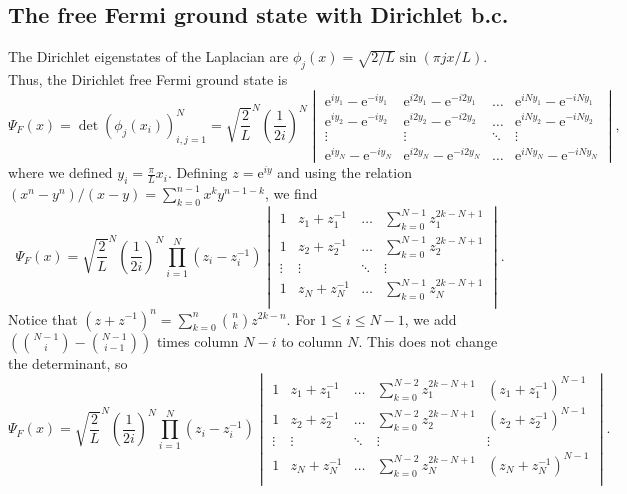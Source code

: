 \documentclass[a4paper,11pt]{article}
\newcommand{\euler}[1]{\text{e}^{#1}}
\numberwithin{equation}{section}
\begin{document}
	\subsection{The free Fermi ground state with Dirichlet b.c.}
	\label{secfreefermi}
	The Dirichlet eigenstates of the Laplacian are $ \phi_j(x)=\sqrt{2/L}\sin(\pi j x/L) $. Thus, the Dirichlet free Fermi ground state is \begin{equation}
		\Psi_F(x)=\det\left(\phi_j(x_i)\right)_{i,j=1}^{N}=\sqrt{\frac{2}{L}}^N\left(\frac{1}{2i}\right)^N\begin{vmatrix}
			\euler{iy_1}-\euler{-iy_1}&\euler{i2y_1}-\euler{-i2y_1}&\ldots&\euler{iNy_1}-\euler{-iNy_1}\\
			\euler{iy_2}-\euler{-iy_2}&\euler{i2y_2}-\euler{-i2y_2}&\ldots&\euler{iNy_2}-\euler{-iNy_2}\\
			\vdots&\vdots&\ddots&\vdots\\
			\euler{iy_N}-\euler{-iy_N}&\euler{i2y_N}-\euler{-i2y_N}&\ldots&\euler{iNy_N}-\euler{-iNy_N}
		\end{vmatrix},
	\end{equation}
	where we defined $ y_i=\frac{\pi}{L}x_i$. Defining $ z=\euler{iy} $ and using the relation $ (x^n-y^n)/(x-y)=\sum_{k=0}^{n-1}x^ky^{n-1-k} $, we find\begin{equation}
		\Psi_F(x)=\sqrt{\frac{2}{L}}^N\left(\frac{1}{2i}\right)^N\prod_{i=1}^{N}(z_i-z_i^{-1})\begin{vmatrix}
			1&z_1+z_1^{-1}&\ldots&\sum_{k=0}^{N-1}z_1^{2k-N+1}\\
			1&z_2+z_2^{-1}&\ldots&\sum_{k=0}^{N-1}z_2^{2k-N+1}\\
			\vdots&\vdots&\ddots&\vdots\\
			1&z_N+z_N^{-1}&\ldots&\sum_{k=0}^{N-1}z_N^{2k-N+1}\\
		\end{vmatrix}.
	\end{equation}
	Notice that $ (z+z^{-1})^n=\sum_{k=0}^{n}\binom{n}{k}z^{2k-n} $.
	For $1\leq i\leq N-1$, we add $ \left(\binom{N-1}{i}-\binom{N-1}{i-1}\right) $ times column $ N-i $ to column $ N $. This does not change the determinant, so \begin{equation}
		\Psi_F(x)=\sqrt{\frac{2}{L}}^N\left(\frac{1}{2i}\right)^N\prod_{i=1}^{N}(z_i-z_i^{-1})\begin{vmatrix}
			1&z_1+z_1^{-1}&\ldots&\sum_{k=0}^{N-2}z_1^{2k-N+1}&(z_1+z_1^{-1})^{N-1}\\
			1&z_2+z_2^{-1}&\ldots&\sum_{k=0}^{N-2}z_2^{2k-N+1}&(z_2+z_2^{-1})^{N-1}\\
			\vdots&\vdots&\ddots&\vdots&\vdots\\
			1&z_N+z_N^{-1}&\ldots&\sum_{k=0}^{N-2}z_N^{2k-N+1}&(z_N+z_N^{-1})^{N-1}\\
		\end{vmatrix}.
	\end{equation}
\end{document}
